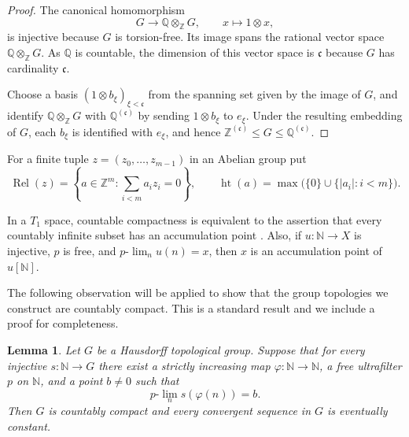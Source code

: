 \documentclass[11pt]{amsart}
\newtheorem{lemma}[theorem]{Lemma}
\theoremstyle{definition}
\newcommand{\N}{\mathbb N}
\newcommand{\Z}{\mathbb Z}
\newcommand{\Q}{\mathbb Q}
\newcommand{\cfrak}{\mathfrak c}
\newcommand{\Rel}{\operatorname{Rel}}
\newcommand{\htop}{\operatorname{ht}}
\begin{document}
\begin{proof}
The canonical homomorphism
\[
 G\longrightarrow\Q\otimes_{\Z}G,
 \qquad x\longmapsto1\otimes x,
\]
is injective because $G$ is torsion-free.  Its image spans the rational vector
space $\Q\otimes_{\Z}G$. As $\mathbb Q$ is countable, the dimension of this vector space is $\cfrak$ because $G$ has cardinality $\cfrak$.

Choose a basis $(1\otimes b_\xi)_{\xi<\cfrak}$ from the spanning set given by
the image of $G$, and identify $\Q\otimes_{\Z}G$ with
$\Q^{(\cfrak)}$ by sending $1\otimes b_\xi$ to $e_\xi$.  Under the resulting
embedding of $G$, each $b_\xi$ is identified with $e_\xi$, and hence
$\Z^{(\cfrak)}\leq G\leq\Q^{(\cfrak)}$.
\end{proof}

For a finite tuple $z=(z_0,\ldots,z_{m-1})$ in an Abelian group put
\[
 \Rel(z)=\left\{a\in\Z^m:\sum_{i<m} a_i z_i=0\right\},
 \qquad
 \htop(a)=\max\bigl(\{0\}\cup\{|a_i|:i<m\}\bigr).
\]

In a $T_1$ space, countable
compactness is equivalent to the assertion that every countably infinite
subset has an accumulation point
\cite[Theorem~3.10.3(v)]{Engelking1989}.  Also, if $u:\N\to X$ is injective,
$p$ is free, and $p\text{-}\lim_n u(n)=x$, then $x$ is an accumulation point
of $u[\N]$.

The following observation will be applied to show that the group topologies
we construct are countably compact.
This is a standard result and we include a proof for completeness.

\begin{lemma}\label{lem:topological-reduction}
Let $G$ be a Hausdorff topological group.  Suppose that for every injective
$s:\N\to G$ there exist a strictly increasing map $\varphi:\N\to\N$, a free
ultrafilter $p$ on $\N$, and a point $b\neq0$ such that
\begin{equation}\label{eq:nonzero-limit-property}
 p\text{-}\lim_n s(\varphi(n))=b.
\end{equation}
Then $G$ is countably compact and every convergent sequence in $G$ is
eventually constant.
\end{lemma}
\end{document}
